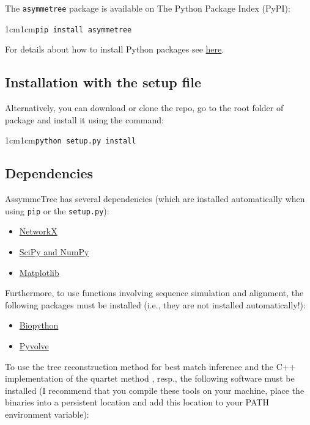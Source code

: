 \documentclass[hidelinks,11pt]{scrreprt}
\newcommand{\COMMANDLINE}[1]{\begingroup\par\vspace{3mm}\color{darkgrey}\begin{adjustwidth}{1cm}{1cm}\texttt{#1}\end{adjustwidth}\vspace{3mm}\endgroup}
\begin{document}
The \texttt{asymmetree} package is available on The Python Package Index (PyPI):

\COMMANDLINE{pip install asymmetree}

\noindent
For details about how to install Python packages see
\href{https://packaging.python.org/tutorials/installing-packages/}{here}.

\subsection{Installation with the setup file}


Alternatively, you can download or clone the repo, go to the root folder of package and install it using the command:

\COMMANDLINE{python setup.py install}


\subsection{Dependencies}

AssymmeTree has several dependencies (which are installed automatically when using \texttt{pip} or the \texttt{setup.py}):

\begin{itemize}
	\item \href{https://networkx.github.io}{NetworkX}
	\item \href{http://www.scipy.org/install.html}{SciPy and NumPy}
	\item \href{https://matplotlib.org/}{Matplotlib}
\end{itemize}

Furthermore, to use functions involving sequence simulation and alignment, the following packages must be installed (i.e., they are not installed automatically!):

\begin{itemize}
	\item \href{http://biopython.org/wiki/Download}{Biopython} \citep{cock2009}
	\item \href{https://github.com/sjspielman/pyvolve}{Pyvolve} \citep{spielman2015}
\end{itemize}

To use the tree reconstruction method for best match inference and the C++ implementation of the quartet method \citep{stadler2020}, resp., the following software must be installed
(I recommend that you compile these tools on your machine, place the binaries into a persistent location and add this location to your PATH environment variable):
\end{document}
